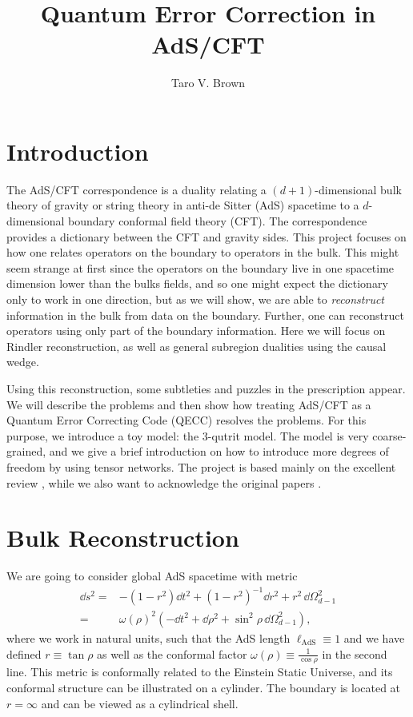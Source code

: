 \documentclass[letter,12pt]{article}
\title{Quantum Error Correction in AdS/CFT}
\author[a]{Taro V. Brown}
\affiliation[a]{Department of Physics, UC Davis, One Shields Avenue, Davis, CA 95616, USA }
\begin{document}
 
\maketitle
\flushbottom
\newpage
\section{Introduction}
The AdS/CFT correspondence is a duality relating a
$(d+1)$-dimensional bulk theory of gravity or string theory in anti-de Sitter (AdS) spacetime to a $d$-dimensional boundary conformal field theory (CFT). The correspondence provides a dictionary between the CFT and gravity sides. This project focuses on how one relates operators on the boundary to operators in the bulk. This might seem strange at first since the operators on the boundary live in one spacetime dimension lower than the bulks fields, and so one might expect the dictionary only to work in one direction, but as we will show, we are able to \textit{reconstruct} information in the bulk from data on the boundary. Further, one can reconstruct operators using only part of the boundary information. Here we will focus on Rindler reconstruction, as well as general subregion dualities using the causal wedge. 

Using this reconstruction, some subtleties and puzzles in the prescription appear. We will describe the problems and then show how treating AdS/CFT as a Quantum Error Correcting Code (QECC) resolves the problems. For this purpose, we introduce a toy model: the 3-qutrit model. The model is very coarse-grained, and we give a brief introduction on how to introduce more degrees of freedom by using tensor networks. The project is based mainly on the excellent review \cite{bib1}, while we also want to acknowledge the original papers \cite{bib2,bib3,bib4}. 
\section{Bulk Reconstruction \label{sec:1}}
We are going to consider global AdS spacetime with metric
\begin{equation}
	\begin{aligned}
		\dd s^2=&-\left(1-r^2\right)\dd t^2+\left(1-r^2\right)^{-1}\dd r^2+r^2\,\dd\Omega_{d-1}^2
		\\
		=&\omega(\rho)^2\left(-\dd t^2+\dd \rho^2+\sin^2\rho\,\dd\Omega_{d-1}^2 \right),
	\end{aligned}
\end{equation}
where we work in natural units, such that the AdS length $\ell_{\text{AdS}}\equiv 1$ and we have defined $r\equiv \tan\rho $ as well as the conformal factor $\omega(\rho)\equiv \frac{1}{\cos\rho}$ in the second line. This metric is conformally related to the Einstein Static Universe, and its conformal structure can be illustrated on a cylinder. The boundary is located at $r=\infty$ and can be viewed as a cylindrical shell.
\end{document}
